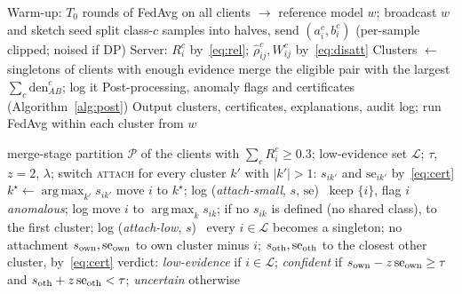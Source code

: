 \documentclass[11pt]{article}
\theoremstyle{definition}
\theoremstyle{remark}
\newcommand{\rhohat}{\hat\rho}
\DeclareMathOperator*{\argmax}{arg\,max}
\begin{document}
\begin{algorithm}[t]
\caption{DisCo-CFL}\label{alg:disco}
\begin{algorithmic}[1]
\State Warm-up: $T_0$ rounds of FedAvg on all clients $\to$ reference model $w$; broadcast $w$ and sketch seed
 
  split class-$c$ samples into halves, send $(a_i^c,b_i^c)$ (per-sample clipped; noised if DP) \EndFor
\EndFor
\State Server: $R_i^c$ by~\eqref{eq:rel}; $\rhohat^c_{ij},W^c_{ij}$ by~\eqref{eq:disatt}
\State Clusters $\gets$ singletons of clients with enough evidence
 merge the eligible pair with the largest $\sum_c\mathrm{den}^c_{AB}$; log it \EndWhile
\State Post-processing, anomaly flags and certificates (Algorithm~\ref{alg:post})
\State Output clusters, certificates, explanations, audit log; run FedAvg within each cluster from $w$
\end{algorithmic}
\end{algorithm}

\begin{algorithm}[t]
\caption{Post-processing, anomaly handling and certificates}\label{alg:post}
\begin{algorithmic}[1]
\Require merge-stage partition $\mathcal P$ of the clients with $\sum_cR_i^c\ge0.3$; low-evidence set $\mathcal L$; $\tau$, $z=2$, $\lambda$; switch \textsc{attach}
  
  \State for every cluster $k'$ with $|k'|>1$: $s_{ik'}$ and $\mathrm{se}_{ik'}$ by~\eqref{eq:cert}
  \State $k^\star\gets\argmax_{k'}s_{ik'}$
   move $i$ to $k^\star$; log (\emph{attach-small}, $s$, $\mathrm{se}$)
  \Else\ keep $\{i\}$, flag $i$ \emph{anomalous}; log
  \EndIf
 \EndFor
  move $i$ to $\argmax_k s_{ik}$; if no $s_{ik}$ is defined (no shared class), to the first cluster; log (\emph{attach-low}, $s$) \EndFor
\Else\ every $i\in\mathcal L$ becomes a singleton; no attachment 
\EndIf
{} 
 \State $s_{\rm own},\mathrm{se}_{\rm own}$ to own cluster minus $i$; $s_{\rm oth},\mathrm{se}_{\rm oth}$ to the closest other cluster, by~\eqref{eq:cert}
 \State verdict: \emph{low-evidence} if $i\in\mathcal L$; \emph{confident} if $s_{\rm own}-z\,\mathrm{se}_{\rm own}\ge\tau$ and $s_{\rm oth}+z\,\mathrm{se}_{\rm oth}<\tau$; \emph{uncertain} otherwise
\EndFor
\end{algorithmic}
\end{algorithm}
\end{document}
